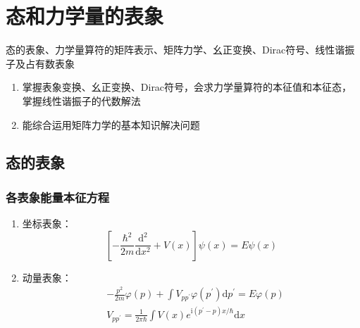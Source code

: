 \documentclass[12pt, a4paper, oneside, UTF8]{ctexbook}
\begin{document}
% 
\else
\fi

\chapter{态和力学量的表象}
\begin{examct}{}{}
    态的表象、力学量算符的矩阵表示、矩阵力学、幺正变换、Dirac符号、线性谐振子及占有数表象
\end{examct}
\begin{examrqm}{}{}
    \begin{enumerate}
        \item 掌握表象变换、幺正变换、Dirac符号，会求力学量算符的本征值和本征态，掌握线性谐振子的代数解法
        \item 能综合运用矩阵力学的基本知识解决问题
    \end{enumerate}
\end{examrqm}

\section{态的表象}

\subsection{各表象能量本征方程}
\begin{enumerate}
    \item 坐标表象：
    \begin{equation}
        \left[-\frac{\hbar^2}{2m}\frac{\mathrm{d}^2}{\mathrm{d}x^2}+V(x)\right]\psi(x)=E\psi(x)
    \end{equation}

    \item 动量表象：
    \begin{equation}
        \begin{matrix}
            & \displaystyle -\frac{p^2}{2m}\varphi(p)+\int V_{pp^{\prime}}\varphi(p^{\prime})\mathrm{d}p^{\prime}=E\varphi(p) \\[10pt]
            & \displaystyle V_{pp^{\prime}}=\frac{1}{2\pi\hbar}\int V(x)e^{\mathrm{i}(p^{\prime}-p)x/\hbar}\mathrm{d}x
        \end{matrix}\label{eq:EnergyEigenequationinMomentumRepresentation}
    \end{equation}
\end{enumerate}
\end{document}
